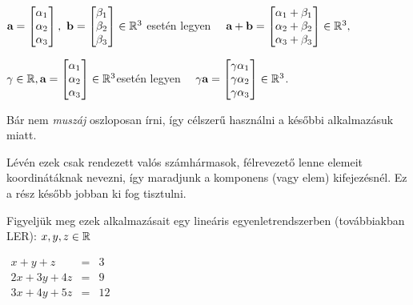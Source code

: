 \documentclass[a4paper,11.5pt]{article}
\begin{document}
		{\centering
			$ \a=
			\begin{bmatrix}
			\alpha_{1}\s \\
			\alpha_{2}\s \\
			\alpha_{3}\s \\
			\end{bmatrix},~ \b =
			\begin{bmatrix}
			\beta_{1}\s \\
			\beta_{2}\s \\
			\beta_{3}\s \\
			\end{bmatrix} \in  \R^{3}$ \quad esetén legyen $\quad \a + \b= 
			\begin{bmatrix}
			\alpha_{1}+\beta_{1}\s \\
			\alpha_{2}+\beta_{2}\s \\
			\alpha_{3}+\beta_{3}\s \\
			\end{bmatrix} \in  \R^{3}, $
			
			$\gamma\in  \R,  \a =
			\begin{bmatrix}
			\alpha_{1}\s \\
			\alpha_{2}\s \\
			\alpha_{3}\s \\
			\end{bmatrix} \in  \R^{3}$\qquad esetén legyen $\quad\gamma\a=
			\begin{bmatrix}
			\gamma\alpha_{1}\s \\
			\gamma\alpha_{2}\s \\
			\gamma\alpha_{3}\s \\
			\end{bmatrix} \in \R^{3}$.
			\par}
	
	\noindent Bár nem \emph{muszáj} oszloposan írni, így célszerű használni a későbbi alkalmazásuk miatt.
	
	Lévén ezek csak rendezett valós számhármasok, félrevezető lenne elemeit koordinátáknak nevezni, így maradjunk a komponens (vagy elem) kifejezésnél. Ez a rész később jobban ki fog tisztulni.
	
	Figyeljük meg ezek alkalmazásait egy lineáris egyenletrendszerben (továbbiakban LER): $x, y, z \in \mathbb{R} $
	
	{\centering
		$\begin{matrix} 
		x + y + z &=& 3\\
		2x + 3y + 4z &=& 9\\
		3x + 4y + 5z& =& 12
		\end{matrix}$
		\par}
\end{document}

